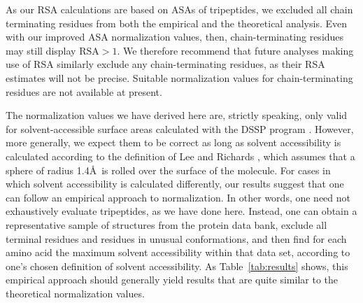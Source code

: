 \documentclass[11pt]{article}
\begin{document}
As our RSA calculations are based on ASAs of tripeptides, we excluded all chain terminating residues from both the empirical and the theoretical analysis. Even with our improved ASA normalization values, then, chain-terminating residues may still display $\text{RSA}>1$. We therefore recommend that future analyses making use of RSA similarly exclude any chain-terminating residues, as their RSA estimates will not be precise. Suitable normalization values for chain-terminating residues are not available at present. 

The normalization values we have derived here are, strictly speaking, only valid for solvent-accessible surface areas calculated with the DSSP program \cite{Kabsch1983}. However, more generally, we expect them to be correct as long as solvent accessibility is calculated according to the definition of Lee and Richards \cite{LeeRichards1971}, which assumes that a sphere of radius 1.4\AA\ is rolled over the surface of the molecule. For cases in which solvent accessibility is calculated differently, our results suggest that one can follow an empirical approach to normalization. In other words, one need not exhaustively evaluate tripeptides, as we have done here. Instead, one can obtain a representative sample of structures from the protein data bank, exclude all terminal residues and residues in unusual conformations, and then find for each amino acid the maximum solvent accessibility within that data set, according to one's chosen definition of solvent accessibility. As Table~\ref{tab:results} shows, this empirical approach should generally yield results that are quite similar to the theoretical normalization values.
\end{document}
